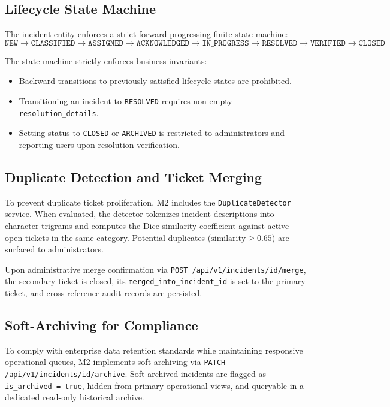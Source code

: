 \documentclass[11pt,a4paper,oneside]{report}
\begin{document}
\subsection{Lifecycle State Machine}
The incident entity enforces a strict forward-progressing finite state machine:
\begin{equation}
\texttt{NEW} \longrightarrow \texttt{CLASSIFIED} \longrightarrow \texttt{ASSIGNED} \longrightarrow \texttt{ACKNOWLEDGED} \longrightarrow \texttt{IN\_PROGRESS} \longrightarrow \texttt{RESOLVED} \longrightarrow \texttt{VERIFIED} \longrightarrow \texttt{CLOSED}
\end{equation}

The state machine strictly enforces business invariants:
\begin{itemize}
    \item Backward transitions to previously satisfied lifecycle states are prohibited.
    \item Transitioning an incident to \texttt{RESOLVED} requires non-empty \texttt{resolution\_details}.
    \item Setting status to \texttt{CLOSED} or \texttt{ARCHIVED} is restricted to administrators and reporting users upon resolution verification.
\end{itemize}

\subsection{Duplicate Detection and Ticket Merging}
To prevent duplicate ticket proliferation, M2 includes the \texttt{DuplicateDetector} service. When evaluated, the detector tokenizes incident descriptions into character trigrams and computes the Dice similarity coefficient against active open tickets in the same category. Potential duplicates ($\text{similarity} \ge 0.65$) are surfaced to administrators. 

Upon administrative merge confirmation via \texttt{POST /api/v1/incidents/{id}/merge}, the secondary ticket is closed, its \texttt{merged\_into\_incident\_id} is set to the primary ticket, and cross-reference audit records are persisted.

\subsection{Soft-Archiving for Compliance}
To comply with enterprise data retention standards while maintaining responsive operational queues, M2 implements soft-archiving via \texttt{PATCH /api/v1/incidents/{id}/archive}. Soft-archived incidents are flagged as \texttt{is\_archived = true}, hidden from primary operational views, and queryable in a dedicated read-only historical archive.
\end{document}
